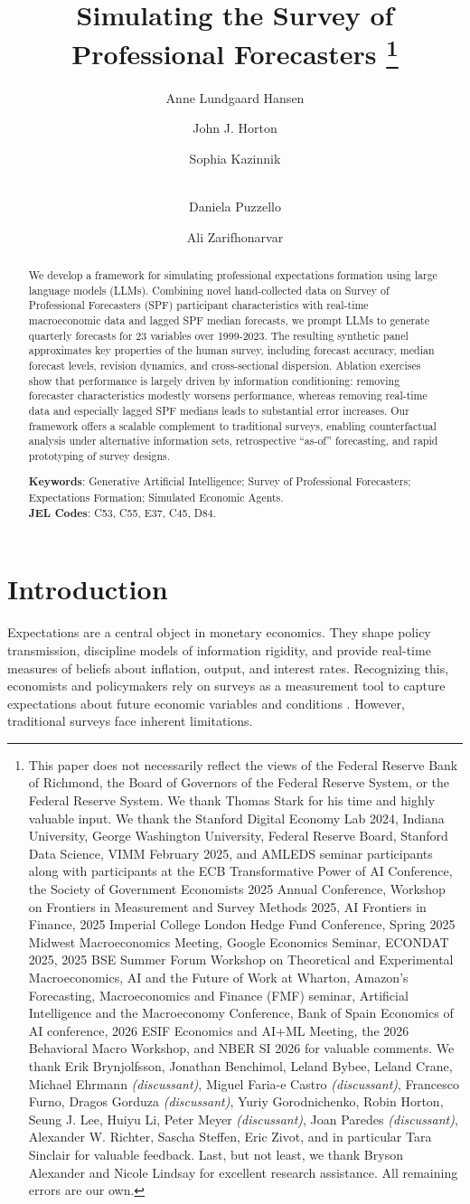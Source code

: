 \documentclass[11pt,letterpaper]{scrartcl}
\title{{\LARGE Simulating the Survey of Professional Forecasters}
\bigskip
\footnote{\scriptsize This paper does not necessarily reflect the views of the Federal Reserve Bank of Richmond, the Board of Governors of the Federal Reserve System, or the Federal Reserve System. We thank Thomas Stark for his time and highly valuable input. We thank the Stanford Digital Economy Lab 2024, Indiana University, George Washington University, Federal Reserve Board, Stanford Data Science, VIMM February 2025, and AMLEDS seminar participants along with participants at the ECB Transformative Power of AI Conference, the Society of Government Economists 2025 Annual Conference, Workshop on Frontiers in Measurement and Survey Methods 2025, AI Frontiers in Finance, 2025 Imperial College London Hedge Fund Conference, Spring 2025 Midwest Macroeconomics Meeting, Google Economics Seminar, ECONDAT 2025, 2025 BSE Summer Forum Workshop on Theoretical and Experimental Macroeconomics, AI and the Future of Work at Wharton, Amazon's Forecasting, Macroeconomics and Finance (FMF) seminar, Artificial Intelligence and the Macroeconomy Conference, Bank of Spain Economics of AI conference, 2026 ESIF Economics and AI+ML Meeting, the 2026 Behavioral Macro Workshop, and NBER SI 2026 for valuable comments. We thank Erik Brynjolfsson, Jonathan Benchimol, Leland Bybee, Leland Crane, Michael Ehrmann \emph{(discussant)}, Miguel Faria-e Castro \emph{(discussant)}, Francesco Furno, Dragos Gorduza \emph{(discussant)}, Yuriy Gorodnichenko, Robin Horton, Seung J. Lee, Huiyu Li, Peter Meyer \emph{(discussant)}, Joan Paredes \emph{(discussant)}, Alexander W. Richter, Sascha Steffen, Eric Zivot, and in particular Tara Sinclair for valuable feedback. Last, but not least, we thank Bryson Alexander and Nicole Lindsay for excellent research assistance. All remaining errors are our own.}
}
\author[a]{\normalsize Anne Lundgaard Hansen}
\affil[a]{\small\textit{\textcolor{magenta}{Corresponding author:} Federal Reserve Bank of Richmond and Federal Reserve Board (\textcolor{magenta}{anne.hansen@rich.frb.org})}}
\author[b]{John J. Horton}
\affil[b]{\small\textit{MIT Sloan School of Management (\textcolor{magenta}{jjhorton@mit.edu})}}
\author[c]{Sophia Kazinnik}
\affil[c]{\small\textit{Stanford HAI (\textcolor{magenta}{kazinnik@stanford.edu})}}
\author[d]{ \\Daniela Puzzello}
\affil[d]{\small\textit{Indiana University Bloomington (\textcolor{magenta}{dpuzzell@iu.edu; alizarif@iu.edu})}}
\author[d]{Ali Zarifhonarvar}
\date{\normalsize This Draft: June 2026\\ First Draft: April 2024\vskip-.2cm}
\begin{document}
\linespread{1.125}\selectfont
\maketitle


\begin{abstract}\small

We develop a framework for simulating professional expectations formation using large language models (LLMs).  Combining novel hand-collected data on Survey of Professional Forecasters (SPF) participant characteristics with real-time macroeconomic data and lagged SPF median forecasts, we prompt LLMs to generate quarterly forecasts for 23 variables over 1999-2023. The resulting synthetic panel approximates key properties of the human survey, including forecast accuracy, median forecast levels, revision dynamics, and cross-sectional dispersion. Ablation exercises show that performance is largely driven by information conditioning: removing forecaster characteristics modestly worsens performance, whereas removing real-time data and especially lagged SPF medians leads to substantial error increases. Our framework offers a scalable complement to traditional surveys, enabling counterfactual analysis under alternative information sets, retrospective ``as-of'' forecasting, and rapid prototyping of survey designs.

\vspace{1em}
\noindent\textbf{Keywords}: Generative Artificial Intelligence; Survey of Professional Forecasters; Expectations Formation; Simulated Economic Agents.\\
\textbf{JEL Codes}: C53, C55, E37, C45, D84.
\end{abstract}
\clearpage

\linespread{1.5}\selectfont


\section{Introduction}\label{sec:intro}

Expectations are a central object in monetary economics. They shape policy transmission, discipline models of information rigidity, and provide real-time measures of beliefs about inflation, output, and interest rates.  Recognizing this, economists and policymakers rely on surveys as a measurement tool to capture expectations about future economic variables and conditions \citep[e.g.,][]{rudebusch2002assessing, orphanides2002robust1, orphanides2002robust2, patton2010why, manzan2011differential, manzan2021are, attanasio2024, caplin2025}. However, traditional surveys face inherent limitations.
 
\end{document}
